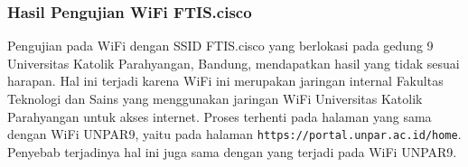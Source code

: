 \subsubsection{Hasil Pengujian WiFi FTIS.cisco}
\label{subsubsec:ftis_cisco}

Pengujian pada WiFi dengan SSID FTIS.cisco yang berlokasi pada gedung 9 Universitas Katolik Parahyangan, Bandung, mendapatkan hasil yang tidak sesuai harapan. Hal ini terjadi karena WiFi ini merupakan jaringan internal Fakultas Teknologi dan Sains yang menggunakan jaringan WiFi Universitas Katolik Parahyangan untuk akses internet. Proses terhenti pada halaman yang sama dengan WiFi UNPAR9, yaitu pada halaman \texttt{https://portal.unpar.ac.id/home}. Penyebab terjadinya hal ini juga sama dengan yang terjadi pada WiFi UNPAR9.